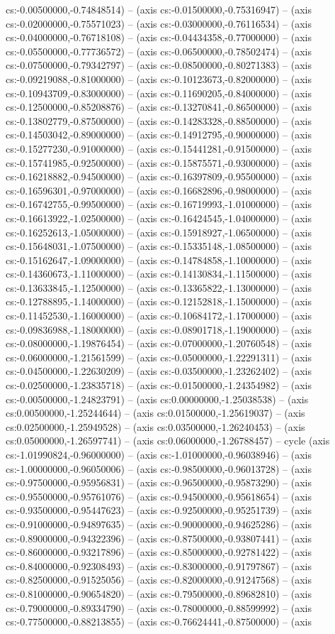 cs:-0.00500000,-0.74848514) -- (axis cs:-0.01500000,-0.75316947) -- (axis cs:-0.02000000,-0.75571023) -- (axis cs:-0.03000000,-0.76116534) -- (axis cs:-0.04000000,-0.76718108) -- (axis cs:-0.04434358,-0.77000000) -- (axis cs:-0.05500000,-0.77736572) -- (axis cs:-0.06500000,-0.78502474) -- (axis cs:-0.07500000,-0.79342797) -- (axis cs:-0.08500000,-0.80271383) -- (axis cs:-0.09219088,-0.81000000) -- (axis cs:-0.10123673,-0.82000000) -- (axis cs:-0.10943709,-0.83000000) -- (axis cs:-0.11690205,-0.84000000) -- (axis cs:-0.12500000,-0.85208876) -- (axis cs:-0.13270841,-0.86500000) -- (axis cs:-0.13802779,-0.87500000) -- (axis cs:-0.14283328,-0.88500000) -- (axis cs:-0.14503042,-0.89000000) -- (axis cs:-0.14912795,-0.90000000) -- (axis cs:-0.15277230,-0.91000000) -- (axis cs:-0.15441281,-0.91500000) -- (axis cs:-0.15741985,-0.92500000) -- (axis cs:-0.15875571,-0.93000000) -- (axis cs:-0.16218882,-0.94500000) -- (axis cs:-0.16397809,-0.95500000) -- (axis cs:-0.16596301,-0.97000000) -- (axis cs:-0.16682896,-0.98000000) -- (axis cs:-0.16742755,-0.99500000) -- (axis cs:-0.16719993,-1.01000000) -- (axis cs:-0.16613922,-1.02500000) -- (axis cs:-0.16424545,-1.04000000) -- (axis cs:-0.16252613,-1.05000000) -- (axis cs:-0.15918927,-1.06500000) -- (axis cs:-0.15648031,-1.07500000) -- (axis cs:-0.15335148,-1.08500000) -- (axis cs:-0.15162647,-1.09000000) -- (axis cs:-0.14784858,-1.10000000) -- (axis cs:-0.14360673,-1.11000000) -- (axis cs:-0.14130834,-1.11500000) -- (axis cs:-0.13633845,-1.12500000) -- (axis cs:-0.13365822,-1.13000000) -- (axis cs:-0.12788895,-1.14000000) -- (axis cs:-0.12152818,-1.15000000) -- (axis cs:-0.11452530,-1.16000000) -- (axis cs:-0.10684172,-1.17000000) -- (axis cs:-0.09836988,-1.18000000) -- (axis cs:-0.08901718,-1.19000000) -- (axis cs:-0.08000000,-1.19876454) -- (axis cs:-0.07000000,-1.20760548) -- (axis cs:-0.06000000,-1.21561599) -- (axis cs:-0.05000000,-1.22291311) -- (axis cs:-0.04500000,-1.22630209) -- (axis cs:-0.03500000,-1.23262402) -- (axis cs:-0.02500000,-1.23835718) -- (axis cs:-0.01500000,-1.24354982) -- (axis cs:-0.00500000,-1.24823791) -- (axis cs:0.00000000,-1.25038538) -- (axis cs:0.00500000,-1.25244644) -- (axis cs:0.01500000,-1.25619037) -- (axis cs:0.02500000,-1.25949528) -- (axis cs:0.03500000,-1.26240453) -- (axis cs:0.05000000,-1.26597741) -- (axis cs:0.06000000,-1.26788457) -- cycle (axis cs:-1.01990824,-0.96000000) -- (axis cs:-1.01000000,-0.96038946) -- (axis cs:-1.00000000,-0.96050006) -- (axis cs:-0.98500000,-0.96013728) -- (axis cs:-0.97500000,-0.95956831) -- (axis cs:-0.96500000,-0.95873290) -- (axis cs:-0.95500000,-0.95761076) -- (axis cs:-0.94500000,-0.95618654) -- (axis cs:-0.93500000,-0.95447623) -- (axis cs:-0.92500000,-0.95251739) -- (axis cs:-0.91000000,-0.94897635) -- (axis cs:-0.90000000,-0.94625286) -- (axis cs:-0.89000000,-0.94322396) -- (axis cs:-0.87500000,-0.93807441) -- (axis cs:-0.86000000,-0.93217896) -- (axis cs:-0.85000000,-0.92781422) -- (axis cs:-0.84000000,-0.92308493) -- (axis cs:-0.83000000,-0.91797867) -- (axis cs:-0.82500000,-0.91525056) -- (axis cs:-0.82000000,-0.91247568) -- (axis cs:-0.81000000,-0.90654820) -- (axis cs:-0.79500000,-0.89682810) -- (axis cs:-0.79000000,-0.89334790) -- (axis cs:-0.78000000,-0.88599992) -- (axis cs:-0.77500000,-0.88213855) -- (axis cs:-0.76624441,-0.87500000) -- (axis 